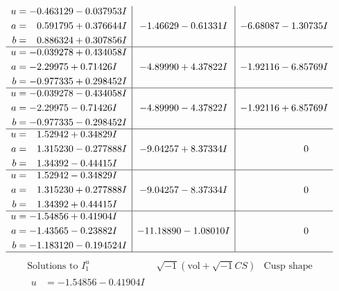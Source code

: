 \documentclass[1p]{elsarticle_modified}
\theoremstyle{definition}
\newcommand{\I}{\sqrt{-1}}
\begin{document}
$$\begin{array}{c|c|c}
\begin{aligned}
u &= -0.463129 - 0.037953 I \\
a &= \phantom{-}0.591795 + 0.376644 I \\
b &= \phantom{-}0.886324 + 0.307856 I\end{aligned}
 & -1.46629 - 0.61331 I & -6.68087 - 1.30735 I \\ \hline\begin{aligned}
u &= -0.039278 + 0.434058 I \\
a &= -2.29975 + 0.71426 I \\
b &= -0.977335 + 0.298452 I\end{aligned}
 & -4.89990 + 4.37822 I & -1.92116 - 6.85769 I \\ \hline\begin{aligned}
u &= -0.039278 - 0.434058 I \\
a &= -2.29975 - 0.71426 I \\
b &= -0.977335 - 0.298452 I\end{aligned}
 & -4.89990 - 4.37822 I & -1.92116 + 6.85769 I \\ \hline\begin{aligned}
u &= \phantom{-}1.52942 + 0.34829 I \\
a &= \phantom{-}1.315230 - 0.277888 I \\
b &= \phantom{-}1.34392 - 0.44415 I\end{aligned}
 & -9.04257 + 8.37334 I & \phantom{-0.000000 } 0 \\ \hline\begin{aligned}
u &= \phantom{-}1.52942 - 0.34829 I \\
a &= \phantom{-}1.315230 + 0.277888 I \\
b &= \phantom{-}1.34392 + 0.44415 I\end{aligned}
 & -9.04257 - 8.37334 I & \phantom{-0.000000 } 0 \\ \hline\begin{aligned}
u &= -1.54856 + 0.41904 I \\
a &= -1.43565 - 0.23882 I \\
b &= -1.183120 - 0.194524 I\end{aligned}
 & -11.18890 - 1.08010 I & \phantom{-0.000000 } 0\\
 \hline 
 \end{array}$$\newpage$$\begin{array}{c|c|c}  
\text{Solutions to }I^u_{1}& \I (\text{vol} + \sqrt{-1}CS) & \text{Cusp shape}\\
 \hline 
\begin{aligned}
u &= -1.54856 - 0.41904 I \\

\end{aligned}
\end{array}$$
\end{document}
